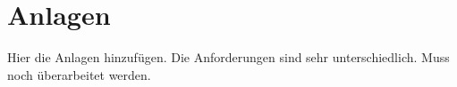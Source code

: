 \appendix%
\chapter*{Anlagen}%
\label{chap: anhang}%
Hier die Anlagen hinzufügen. Die Anforderungen sind sehr unterschiedlich. Muss noch überarbeitet werden.
\newpage%
